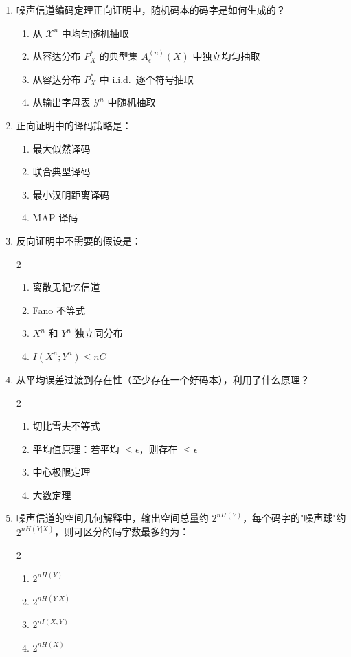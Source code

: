 \documentclass[12pt,a4paper]{ctexart}
\newcommand{\XX}{\mathcal{X}}
\newcommand{\YY}{\mathcal{Y}}
\begin{document}
\begin{enumerate}[label=\arabic*., leftmargin=*]

\item 噪声信道编码定理正向证明中，随机码本的码字是如何生成的？
\begin{enumerate}[label=(\Alph*)]
  \item 从 $\XX^n$ 中均匀随机抽取
  \item 从容达分布 $P_X^*$ 的典型集 $A_\epsilon^{(n)}(X)$ 中独立均匀抽取
  \item 从容达分布 $P_X^*$ 中 i.i.d.\ 逐个符号抽取
  \item 从输出字母表 $\YY^n$ 中随机抽取
\end{enumerate}

\item 正向证明中的译码策略是：
\begin{enumerate}[label=(\Alph*)]
  \item 最大似然译码
  \item 联合典型译码
  \item 最小汉明距离译码
  \item MAP 译码
\end{enumerate}

\item 反向证明中不需要的假设是：
\begin{multicols}{2}
\begin{enumerate}[label=(\Alph*)]
  \item 离散无记忆信道
  \item Fano 不等式
  \item $X^n$ 和 $Y^n$ 独立同分布
  \item $I(X^n;Y^n) \leq nC$
\end{enumerate}
\end{multicols}

\item 从平均误差过渡到存在性（至少存在一个好码本），利用了什么原理？
\begin{multicols}{2}
\begin{enumerate}[label=(\Alph*)]
  \item 切比雪夫不等式
  \item 平均值原理：若平均 $\leq \epsilon$，则存在 $\leq \epsilon$
  \item 中心极限定理
  \item 大数定理
\end{enumerate}
\end{multicols}

\item 噪声信道的空间几何解释中，输出空间总量约 $2^{nH(Y)}$，每个码字的"噪声球"约 $2^{nH(Y|X)}$，则可区分的码字数最多约为：
\begin{multicols}{2}
\begin{enumerate}[label=(\Alph*)]
  \item $2^{nH(Y)}$
  \item $2^{nH(Y|X)}$
  \item $2^{nI(X;Y)}$
  \item $2^{nH(X)}$
\end{enumerate}
\end{multicols}


\end{enumerate}
\end{document}
